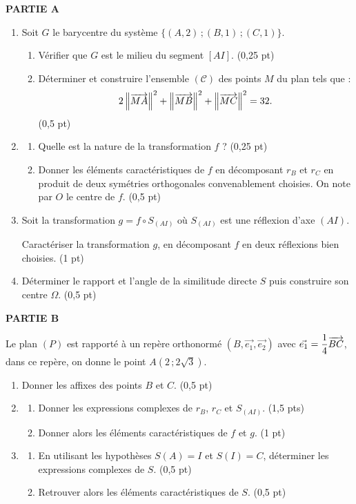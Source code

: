 \medskip
\noindent\textbf{PARTIE A}

\begin{enumerate}
	\item Soit $G$ le barycentre du système $\{(A,2)\,;(B,1)\,;(C,1)\}$.
	\begin{enumerate}
		\item Vérifier que $G$ est le milieu du segment $[AI]$. \hfill (0,25 pt)
		\item Déterminer et construire l'ensemble $(\mathscr{C})$ des points $M$ du plan tels que :
		$$
		2\left\Vert \overrightarrow{MA} \right\Vert^2 + \left\Vert \overrightarrow{MB} \right\Vert^2 + \left\Vert \overrightarrow{MC} \right\Vert^2 = 32.
		$$
		\hfill (0,5 pt)
	\end{enumerate}
	\item
	\begin{enumerate}
		\item Quelle est la nature de la transformation $f$ ? \hfill (0,25 pt)
		\item Donner les éléments caractéristiques de $f$ en décomposant $r_B$ et $r_C$ en produit de deux symétries orthogonales convenablement choisies. On note par $O$ le centre de $f$. \hfill (0,5 pt)
	\end{enumerate}
	\item Soit la transformation $g = f \circ S_{(AI)}$ où $S_{(AI)}$ est une réflexion d'axe $(AI)$.

	Caractériser la transformation $g$, en décomposant $f$ en deux réflexions bien choisies. \hfill (1 pt)
	\item Déterminer le rapport et l'angle de la similitude directe $S$ puis construire son centre $\Omega$. \hfill (0,5 pt)
\end{enumerate}

\medskip
\noindent\textbf{PARTIE B}

Le plan $(P)$ est rapporté à un repère orthonormé $(B,\vec{e_1},\vec{e_2})$ avec $\vec{e_1} = \dfrac{1}{4}\overrightarrow{BC}$, dans ce repère, on donne le point $A(2\,;2\sqrt{3})$.

\begin{enumerate}
	\item Donner les affixes des points $B$ et $C$. \hfill (0,5 pt)
	\item
	\begin{enumerate}
		\item Donner les expressions complexes de $r_B$, $r_C$ et $S_{(AI)}$. \hfill (1,5 pts)
		\item Donner alors les éléments caractéristiques de $f$ et $g$. \hfill (1 pt)
	\end{enumerate}
	\item
	\begin{enumerate}
		\item En utilisant les hypothèses $S(A) = I$ et $S(I) = C$, déterminer les expressions complexes de $S$. \hfill (0,5 pt)
		\item Retrouver alors les éléments caractéristiques de $S$. \hfill (0,5 pt)
	\end{enumerate}
\end{enumerate}


